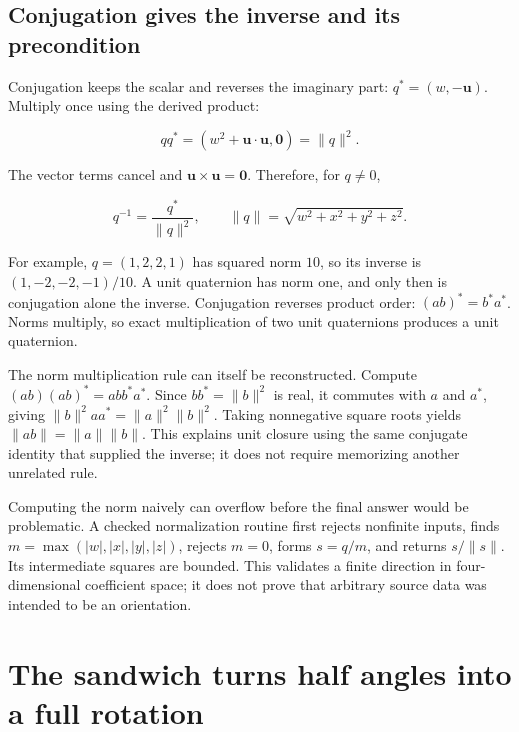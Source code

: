 \subsection{Conjugation gives the inverse and its precondition}\label{01-foundations-i-ch019-conjugation-gives-the-inverse-and-its-precondition}

\hypertarget{01-foundations-i-ch019-conjugation-gives-the-inverse-and-its-precondition}{}

Conjugation keeps the scalar and reverses the imaginary part: \(q^*=(w,-\mathbf u)\). Multiply once using the derived product:

\[
qq^*=(w^2+\mathbf u\cdot\mathbf u,\mathbf0)
=\|q\|^2.
\]

The vector terms cancel and \(\mathbf u\times\mathbf u=\mathbf0\). Therefore, for \(q\ne0\),

\[
q^{-1}=\frac{q^*}{\|q\|^2},
\qquad
\|q\|=\sqrt{w^2+x^2+y^2+z^2}.
\]

For example, \(q=(1,2,2,1)\) has squared norm \(10\), so its inverse is \((1,-2,-2,-1)/10\). A unit quaternion has norm one, and only then is conjugation alone the inverse. Conjugation reverses product order: \((ab)^*=b^*a^*\). Norms multiply, so exact multiplication of two unit quaternions produces a unit quaternion.

The norm multiplication rule can itself be reconstructed. Compute \((ab)(ab)^*=abb^*a^*\). Since \(bb^*=\|b\|^2\) is real, it commutes with \(a\) and \(a^*\), giving \(\|b\|^2aa^*=\|a\|^2\|b\|^2\). Taking nonnegative square roots yields \(\|ab\|=\|a\|\|b\|\). This explains unit closure using the same conjugate identity that supplied the inverse; it does not require memorizing another unrelated rule.

Computing the norm naively can overflow before the final answer would be problematic. A checked normalization routine first rejects nonfinite inputs, finds \(m=\max(|w|,|x|,|y|,|z|)\), rejects \(m=0\), forms \(s=q/m\), and returns \(s/\|s\|\). Its intermediate squares are bounded. This validates a finite direction in four-dimensional coefficient space; it does not prove that arbitrary source data was intended to be an orientation.

\section{The sandwich turns half angles into a full rotation}\label{01-foundations-i-ch019-the-sandwich-turns-half-angles-into-a-full-rotation}

